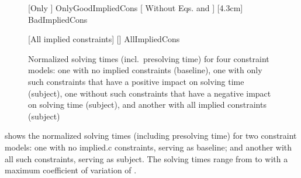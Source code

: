 \begin{figure}
  \centering%

                      [Only ]
                      {OnlyGoodImpliedCons}%
  \hfill%
                      [%
                        Without Eqs.\thinspace%
                         and
                      ]%
                      [4.3cm]%
                      {BadImpliedCons}%

  \vspace{\betweensubfigures}

                      [All implied constraints]%
                      [\linewidth]%
                      {AllImpliedCons}%

  \caption[%
            Plot for evaluating the impact on solving time made by different
            configurations of implied constraints%
          ]%
          {%
            Normalized solving times (incl.\ presolving time) for four
            constraint models: one with no implied constraints (baseline), one
            with only such constraints that have a positive impact on solving
            time (subject), one without such constraints that have a negative
            impact on solving time (subject), and another with all implied
            constraints (subject)%
          }
\end{figure}

 shows the normalized solving
times (including presolving time) for two \glspl{constraint model}: one with no
\gls{implied.c} \glspl{constraint}, serving as \gls{baseline}; and another with
all such \glspl{constraint}, serving as \gls{subject}.
%
The solving times range from
\SIMinOf{
  \SolvTechEnableOnlyGoodImpliedConsPrePlusSolvingTimeSpeedupNonePrePlusSolvingTimeAvgMin,
  \SolvTechEnableOnlyGoodImpliedConsPrePlusSolvingTimeSpeedupPrePlusSolvingTimeAvgMin,
  \SolvTechDisableBadImpliedConsPrePlusSolvingTimeSpeedupPrePlusSolvingTimeAvgMin,
  \SolvTechDisableAllImpliedConsPrePlusSolvingTimeSpeedupPrePlusSolvingTimeAvgMin
}{\s}
to
\SIMinOf{
  \SolvTechEnableOnlyGoodImpliedConsPrePlusSolvingTimeSpeedupNonePrePlusSolvingTimeAvgMax,
  \SolvTechEnableOnlyGoodImpliedConsPrePlusSolvingTimeSpeedupPrePlusSolvingTimeAvgMax,
  \SolvTechDisableBadImpliedConsPrePlusSolvingTimeSpeedupPrePlusSolvingTimeAvgMax,
  \SolvTechDisableAllImpliedConsPrePlusSolvingTimeSpeedupPrePlusSolvingTimeAvgMax
}{\s}
with a maximum coefficient of variation of
\numMaxOf{
  \SolvTechEnableOnlyGoodImpliedConsPrePlusSolvingTimeSpeedupNonePrePlusSolvingTimeCvMax,
  \SolvTechEnableOnlyGoodImpliedConsPrePlusSolvingTimeSpeedupPrePlusSolvingTimeCvMax,
  \SolvTechDisableBadImpliedConsPrePlusSolvingTimeSpeedupPrePlusSolvingTimeCvMax,
  \SolvTechDisableAllImpliedConsPrePlusSolvingTimeSpeedupPrePlusSolvingTimeCvMax
}.
%


